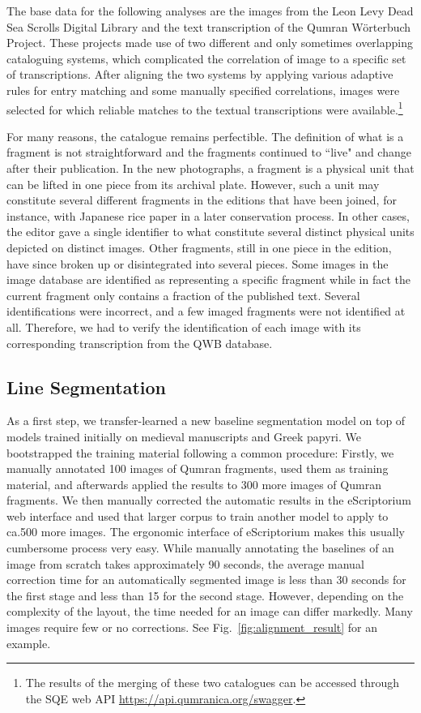 The base data for the following analyses are the images from the Leon Levy Dead
Sea Scrolls Digital Library and the text transcription of the Qumran Wörterbuch
Project.  These projects made use of two different and only sometimes
overlapping cataloguing systems, which complicated the correlation of image to
a specific set of transcriptions.  After aligning the two systems by applying
various adaptive rules for entry matching and some manually specified
correlations, images were selected for which reliable matches to the textual
transcriptions were available.\footnote{The results of the merging of these two
catalogues can be accessed through the SQE web API
\url{https://api.qumranica.org/swagger}.}

For many reasons, the catalogue remains perfectible.  The definition of what is
a fragment is not straightforward and the fragments continued to ``live" and
change after their publication.  In the new photographs, a fragment is a
physical unit that can be lifted in one piece from its archival plate.
However, such a unit may constitute several different fragments in the editions
that have been joined, for instance, with Japanese rice paper in a later
conservation process.  In other cases, the editor gave a single identifier to
what constitute several distinct physical units depicted on distinct images.
Other fragments, still in one piece in the edition, have since broken up or
disintegrated into several pieces.  Some images in the image database are
identified as representing a specific fragment while in fact the current
fragment only contains a fraction of the published text.  Several
identifications were incorrect, and a few imaged fragments were not identified
at all.  Therefore, we had to verify the identification of each image with its
corresponding transcription from the QWB database.

\subsection{Line Segmentation}\label{sec:lseg}

As a first step, we transfer-learned a new baseline segmentation model on top
of models trained initially on medieval manuscripts and Greek papyri.  We
bootstrapped the training material following a common procedure:  Firstly, we
manually annotated 100 images of Qumran fragments, used them as training
material, and afterwards applied the results to 300 more images of Qumran
fragments.  We then manually corrected the automatic results in the
eScriptorium web interface and used that larger corpus to train another model
to apply to ca.\@ 500 more images.  The ergonomic interface of eScriptorium
makes this usually cumbersome process very easy.  While manually annotating the
baselines of an image from scratch takes approximately 90 seconds, the average
manual correction time for an automatically segmented image is less than 30
seconds for the first stage and less than 15 for the second stage.  However,
depending on the complexity of the layout, the time needed for an image can
differ markedly.  Many images require few or no corrections.  See
Fig.~\ref{fig:alignment_result} for an example.

